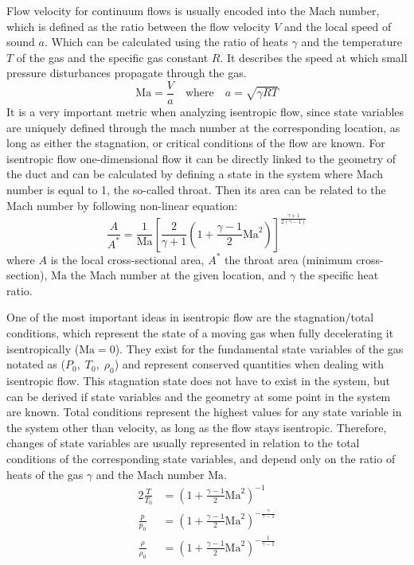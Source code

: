 	Flow velocity for continuum flows is usually encoded into the Mach number, which is defined as the ratio between the flow velocity $V$ and the local speed of sound $a$.
	Which can be calculated using the ratio of heats $\gamma$ and the temperature $T$ of the gas and the specific gas constant $R$.
	It describes the speed at which small pressure disturbances propagate through the gas.
	\begin{equation}
		\mathrm{Ma} = \frac{V}{a}
		\quad \text{where} \quad
		a = \sqrt{\gamma R T}
		\label{eq:mach-number}
	\end{equation}
	It is a very important metric when analyzing isentropic flow, since state variables are uniquely defined through the mach number at the corresponding location, as long as either the stagnation, or critical conditions of the flow are known.
	For isentropic flow one-dimensional flow it can be directly linked to the geometry of the duct and can be calculated by defining a state in the system where Mach number is equal to 1, the so-called throat.
	Then its area can be related to the Mach number by following non-linear equation:
	\begin{equation}
		\frac{A}{A^*} = \frac{1}{\mathrm{Ma}} \left[ \frac{2}{\gamma + 1} \left( 1 + \frac{\gamma - 1}{2} \mathrm{Ma}^2 \right) \right]^{\frac{\gamma + 1}{2(\gamma - 1)}}
		\label{eq:area_ratio_mach}
	\end{equation}
	where $A$ is the local cross-sectional area, $A^*$ the throat area (minimum cross-section), $\mathrm{Ma}$ the Mach number at the given location, and $\gamma$ the specific heat ratio.

	One of the most important ideas in isentropic flow are the stagnation/total conditions, which represent the state of a moving gas when fully decelerating it isentropically ($\mathrm{Ma} = 0$).
	They exist for the fundamental state variables of the gas notated as ($P_0,\;T_0,\;\rho_0$) and represent conserved quantities when dealing with isentropic flow.
	This stagnation state does not have to exist in the system, but can be derived if state variables and the geometry at some point in the system are known.
	Total conditions represent the highest values for any state variable in the system other than velocity, as long as the flow stays isentropic.
	Therefore, changes of state variables are usually represented in relation to the total conditions of the corresponding state variables, and depend only on the ratio of heats of the gas $\gamma$ and the Mach number $\mathrm{Ma}$.
	\begin{alignat}{2}
	    \frac{T}{T_0}   & = \left( 1 + \frac{\gamma - 1}{2} \mathrm{Ma}^2 \right)^{-1} \label{eq:total_relation_T}\\
	    \frac{p}{p_0}   & = \left( 1 + \frac{\gamma - 1}{2} \mathrm{Ma}^2 \right)^{-\frac{\gamma}{\gamma - 1}} \label{eq:total_relation_p}\\
	    \frac{\rho}{\rho_0} & = \left( 1 + \frac{\gamma - 1}{2} \mathrm{Ma}^2 \right)^{-\frac{1}{\gamma - 1}} \label{eq:total_relation_rho}
	\end{alignat}

